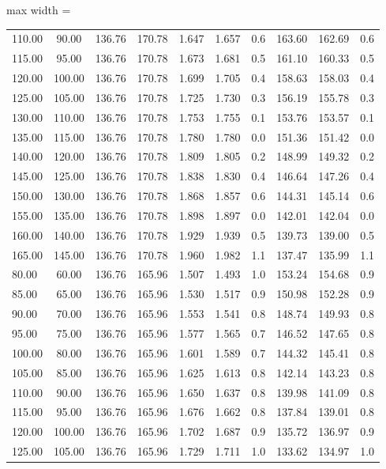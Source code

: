 \documentclass[english]{SPFShortReport}
\begin{document}
\begin{table}[!ht]
\begin{adjustbox}{max width =\textwidth}
\begin{tabular}{l | c c c c c c c c c }
110.00 & 90.00 & 136.76 & 170.78 & 1.647 & 1.657 & 0.6 & 163.60 & 162.69 & 0.6\\ 
115.00 & 95.00 & 136.76 & 170.78 & 1.673 & 1.681 & 0.5 & 161.10 & 160.33 & 0.5\\ 
120.00 & 100.00 & 136.76 & 170.78 & 1.699 & 1.705 & 0.4 & 158.63 & 158.03 & 0.4\\ 
125.00 & 105.00 & 136.76 & 170.78 & 1.725 & 1.730 & 0.3 & 156.19 & 155.78 & 0.3\\ 
130.00 & 110.00 & 136.76 & 170.78 & 1.753 & 1.755 & 0.1 & 153.76 & 153.57 & 0.1\\ 
135.00 & 115.00 & 136.76 & 170.78 & 1.780 & 1.780 & 0.0 & 151.36 & 151.42 & 0.0\\ 
140.00 & 120.00 & 136.76 & 170.78 & 1.809 & 1.805 & 0.2 & 148.99 & 149.32 & 0.2\\ 
145.00 & 125.00 & 136.76 & 170.78 & 1.838 & 1.830 & 0.4 & 146.64 & 147.26 & 0.4\\ 
150.00 & 130.00 & 136.76 & 170.78 & 1.868 & 1.857 & 0.6 & 144.31 & 145.14 & 0.6\\ 
155.00 & 135.00 & 136.76 & 170.78 & 1.898 & 1.897 & 0.0 & 142.01 & 142.04 & 0.0\\ 
160.00 & 140.00 & 136.76 & 170.78 & 1.929 & 1.939 & 0.5 & 139.73 & 139.00 & 0.5\\ 
165.00 & 145.00 & 136.76 & 170.78 & 1.960 & 1.982 & 1.1 & 137.47 & 135.99 & 1.1\\ 
80.00 & 60.00 & 136.76 & 165.96 & 1.507 & 1.493 & 1.0 & 153.24 & 154.68 & 0.9\\ 
85.00 & 65.00 & 136.76 & 165.96 & 1.530 & 1.517 & 0.9 & 150.98 & 152.28 & 0.9\\ 
90.00 & 70.00 & 136.76 & 165.96 & 1.553 & 1.541 & 0.8 & 148.74 & 149.93 & 0.8\\ 
95.00 & 75.00 & 136.76 & 165.96 & 1.577 & 1.565 & 0.7 & 146.52 & 147.65 & 0.8\\ 
100.00 & 80.00 & 136.76 & 165.96 & 1.601 & 1.589 & 0.7 & 144.32 & 145.41 & 0.8\\ 
105.00 & 85.00 & 136.76 & 165.96 & 1.625 & 1.613 & 0.8 & 142.14 & 143.23 & 0.8\\ 
110.00 & 90.00 & 136.76 & 165.96 & 1.650 & 1.637 & 0.8 & 139.98 & 141.09 & 0.8\\ 
115.00 & 95.00 & 136.76 & 165.96 & 1.676 & 1.662 & 0.8 & 137.84 & 139.01 & 0.8\\ 
120.00 & 100.00 & 136.76 & 165.96 & 1.702 & 1.687 & 0.9 & 135.72 & 136.97 & 0.9\\ 
125.00 & 105.00 & 136.76 & 165.96 & 1.729 & 1.711 & 1.0 & 133.62 & 134.97 & 1.0\\ 

\end{tabular}
\end{adjustbox}
\end{table}
\end{document}
